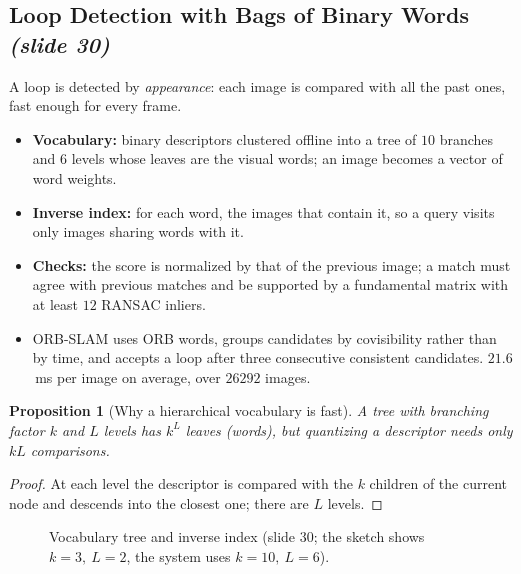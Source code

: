 \documentclass[11pt,a4paper]{article}
\newcommand{\slrs}[1]{\texorpdfstring{\emph{(slide #1)}}{(slide #1)}}
\theoremstyle{definition}
\theoremstyle{plain}
\newtheorem{proposition}[definition]{Proposition}
\theoremstyle{remark}
\begin{document}
\subsection{Loop Detection with Bags of Binary Words \slrs{30}}
A loop is detected by \emph{appearance}: each image is compared with all the past ones, fast enough for every frame.
\begin{itemize}[nosep]
\item \textbf{Vocabulary:} binary descriptors clustered offline into a tree of $10$ branches and $6$ levels whose leaves are the visual words; an image becomes a vector of word weights.
\item \textbf{Inverse index:} for each word, the images that contain it, so a query visits only images sharing words with it.
\item \textbf{Checks:} the score is normalized by that of the previous image; a match must agree with previous matches and be supported by a fundamental matrix with at least $12$ RANSAC inliers.
\item ORB-SLAM uses ORB words, groups candidates by covisibility rather than by time, and accepts a loop after three consecutive consistent candidates. $21.6$\,ms per image on average, over $26292$ images.
\end{itemize}
\begin{proposition}[Why a hierarchical vocabulary is fast]\label{prop:vocab}
A tree with branching factor $k$ and $L$ levels has $k^L$ leaves (words), but quantizing a descriptor needs only $kL$ comparisons.
\end{proposition}
\begin{proof}
At each level the descriptor is compared with the $k$ children of the current node and descends into the closest one; there are $L$ levels. \qedhere
\end{proof}
\begin{figure}[htbp]\centering
{}
\caption{Vocabulary tree and inverse index (slide 30; the sketch shows $k=3,\ L=2$, the system uses $k=10,\ L=6$).}
\end{figure}
\end{document}
